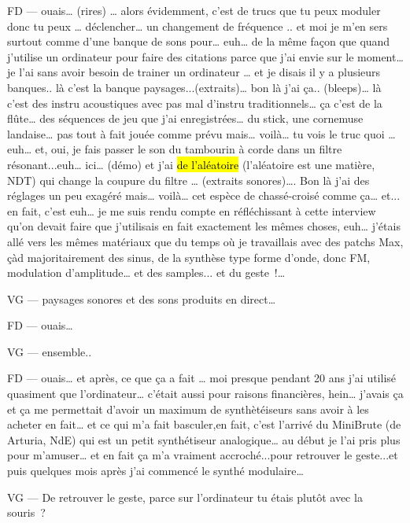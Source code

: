 FD —  ouais… (rires) … alors évidemment, c'est de trucs que tu peux moduler donc tu peux … déclencher… un changement de fréquence .. et moi je m'en sers surtout comme d'une banque de sons pour… euh… de la même façon que quand j'utilise un ordinateur pour faire des citations parce que j'ai envie sur le moment… je l'ai sans avoir besoin de trainer un ordinateur … et je disais il y a plusieurs banques.. là c'est la banque paysages...(extraits)… bon là j'ai ça.. (bleeps)… là c'est des instru acoustiques avec pas mal d'instru traditionnels… ça c'est de la flûte… des séquences de jeu que j'ai enregistrées… du stick, une cornemuse landaise… pas tout à fait jouée comme prévu mais… voilà… tu vois le truc quoi … euh… et, oui, je fais passer le son du tambourin à corde dans un filtre résonant...euh… ici… (démo) et j'ai \hl{de l'aléatoire} (l'aléatoire est une matière, NDT) qui change la coupure du filtre … (extraits sonores)…. Bon là j'ai des réglages un peu exagéré mais… voilà… cet espèce de chassé-croisé comme ça… et... en fait, c'est euh… je me suis rendu compte en réfléchissant à cette interview qu'on devait faire que j'utilisais en fait exactement les mêmes choses, euh… j'étais allé vers les mêmes matériaux que du temps où je travaillais avec des patchs Max, çàd majoritairement des sinus, de la synthèse type forme d'onde, donc FM, modulation d'amplitude… et des samples... et du geste !… 

VG —  paysages sonores et des sons produits en direct… 

FD —  ouais… 

VG —  ensemble.. 

FD —  ouais… et après, ce que ça a fait … moi presque pendant 20 ans j'ai utilisé quasiment que l'ordinateur… c'était aussi pour raisons financières, hein… j'avais ça et ça me permettait d'avoir un maximum de synthètéiseurs sans avoir à les acheter en fait… et ce qui m'a fait basculer,en fait,  c'est l'arrivé du MiniBrute (de Arturia, NdE) qui est un petit synthétiseur analogique… au début je l'ai pris plus pour m'amuser… et en fait ça m'a vraiment accroché...pour retrouver le geste...et puis quelques mois après j'ai commencé le synthé modulaire… 

VG —  De retrouver le geste, parce sur l'ordinateur tu étais plutôt avec la souris ? 

